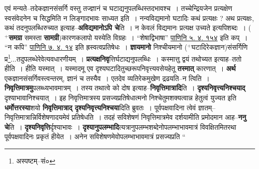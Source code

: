 \documentclass[article,12pt,a4paper]{memoir}
\newcommand{\add}[1]{($^{+}$#1)}
\begin{document}
	  \pstart एवं मन्यते--तदेकज्ञानसंसर्गि वस्तु तज्ज्ञानं च घटाद्यनुपलब्धिस्तदभावश्च । तच्चेन्द्रियजेन प्रत्यक्षेण स्वसंवेदनेन च सिद्धमिति न लिङ्गादभावः साध्यत इति । नन्वविद्यमानो घटादिः कथं प्रत्यक्षः ? अथ प्रत्यक्षः, कथं तदनुपलब्धिरुच्यत इत्याह--\textbf{अविद्यमानोऽपि चे}ति । न केवलं विद्यमानः प्रत्यक्ष उच्यते इत्यपिशब्दः । \add{\textbf{समग्रा} समस्ता \textbf{सामग्री}}कारणकलापो यस्येति विग्रहः । “शेषाद्विभाषा” \href{http://http://sarit.indology.info/?cref=Pā.5.4.154}{पाणिनि ५. ४. १५४} इति कप् । “न कपि” \href{http://http://sarit.indology.info/?cref=Pā.7.4.14}{पाणिनि ७. ४. १४} इति ह्रस्वत्वप्रतिषेधः । \textbf{ज्ञायमानो} निश्चीयमानो \add{घटादिरेकज्ञान}संसर्गिणि प्र\footnote{अस्पष्टम्--सं०}\-...तदुपलब्धेरेवेत्यवधारणीयम् । \textbf{प्रत्यक्षनिवृ}त्तिर्घटाद्यनुपलब्धिः । कस्मात्तु द्वयं तथोच्यत इत्याह--ततो हीति । हीति यस्मात् । यस्मादमू एव दृश्यघटादितुच्छरूपनिवृत्त्यवसेयहेतू \textbf{तस्मात्} कारणात् । \textbf{अर्थ} एकज्ञानसंसर्गिवस्त्वन्तरम्, ज्ञानं च तस्यैव । एतदेव व्यतिरेकमुखेण द्रढयति--न त्विति । \textbf{निवृत्तिमात्रमु}पलब्ध्यभावमात्रम् । तस्य तथात्वे को दोष इत्याह--\textbf{निवृत्तिमात्रादि}ति । \textbf{दृश्यनिवृत्त्यनिश्चयाद्} दृश्याभावानिश्चयात् । इह निवृत्तिमात्रस्य प्रसज्यप्रतिषेधात्मनो निश्चेतुमशक्यत्वान्न हेतुत्वं युज्यत इति \textbf{धर्मोत्तरस्या}शयो \textbf{निवृत्तिमात्राद् दृश्यनिवृत्त्यनिश्चया}दिति ब्रुवतः । पूर्वपक्षवादिना त्वेवं ज्ञातम्--निवृत्तिमात्रान्निर्विशेषणादयमेवं प्रतिषेधति । तदहं सविशेषणं निवृत्तिमात्रमेव दर्शयामीति प्रमोदमान आह--\textbf{ननु चे}ति । \textbf{दृश्यनिवृत्ति}र्दृश्याभावः । \textbf{दृश्यानुपलम्भादि}त्यत्रानुपलम्भशब्देनोपलम्भाभावमात्रं विवक्षितमितरथा पूर्वपक्षवादिनः प्रकृतं हीयेत । अनेन सविशेषणमेवोपलम्भाभावमात्रं प्रसज्यप्रति  \leavevmode{} “
	  
\end{document}

